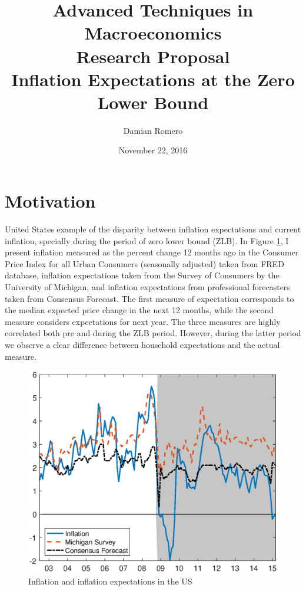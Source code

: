 \documentclass[11pt]{article}
\title{Advanced Techniques in Macroeconomics\\Research Proposal\\Inflation Expectations at the Zero Lower Bound}
\author{Damian Romero}
\date{November 22, 2016}
\begin{document}
	
\maketitle

\section*{Motivation} 

United States example of the disparity between inflation expectations and current inflation, specially during the period of zero lower bound (ZLB). In Figure \ref{fig:motivation}, I present inflation measured as the percent change 12 months ago in the Consumer Price Index for all Urban Consumers (seasonally adjusted) taken from FRED database, inflation expectations taken from the Survey of Consumers by the University of Michigan, and inflation expectations from professional forecasters taken from Consensus Forecast. The first measure of expectation corresponds to the median expected price change in the next 12 months, while the second measure considers expectations for next year. The three measures are highly correlated both pre and during the ZLB period. However, during the latter period we observe a clear difference between household expectations and the actual measure.

\begin{figure}[H]
	\centering
	\caption{Inflation and inflation expectations in the US}\label{fig:motivation}
	\includegraphics[scale=0.7]{motivation}
\end{figure}
\end{document}
